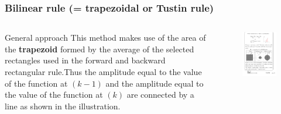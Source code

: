 \begin{frame}
	\frametitle{Bilinear rule (= trapezoidal or Tustin rule)}
\begin{columns}
	\begin{column}{0.5\textwidth}
		\begin{block}{General approach}
			This method makes use of the area of the \textbf{trapezoid} formed by the average of the selected rectangles used in the forward and backward rectangular rule.Thus the amplitude equal to the value of the function at $(k-1)$ and the amplitude equal to the value of the function at $(k)$ are connected by a line as shown in the illustration.
		\end{block}	
	\end{column}

	\begin{column}{0.5\textwidth}
		\begin{figure}
			\centering
			\includegraphics[width=1\linewidth]{T_euler}
		\end{figure}
	\end{column}	
\end{columns}
\end{frame}

